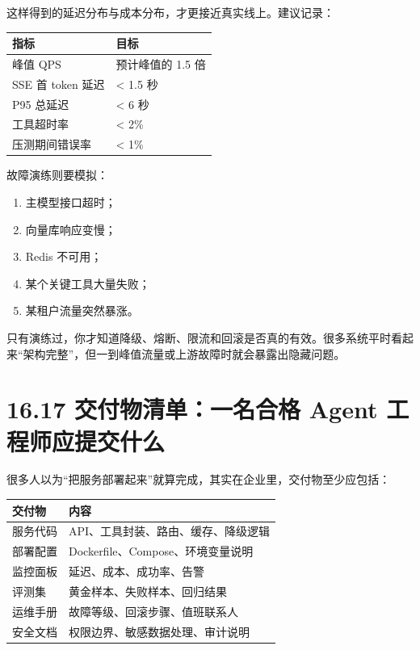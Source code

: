 这样得到的延迟分布与成本分布，才更接近真实线上。建议记录：


\begingroup
\scriptsize
\setlength{\tabcolsep}{3pt}
\begin{longtable}{|p{}|p{}|}
\hline
指标 & 目标 \\ \hline
峰值 QPS & 预计峰值的 1.5 倍 \\ \hline
SSE 首 token 延迟 & < 1.5 秒 \\ \hline
P95 总延迟 & < 6 秒 \\ \hline
工具超时率 & < 2\% \\ \hline
压测期间错误率 & < 1\% \\ \hline
\end{longtable}
\endgroup

故障演练则要模拟：


\begin{enumerate}[leftmargin=2em]
\item 主模型接口超时；
\item 向量库响应变慢；
\item Redis 不可用；
\item 某个关键工具大量失败；
\item 某租户流量突然暴涨。
\end{enumerate}

只有演练过，你才知道降级、熔断、限流和回滚是否真的有效。很多系统平时看起来``架构完整''，但一到峰值流量或上游故障时就会暴露出隐藏问题。


\section{16.17 交付物清单：一名合格 Agent 工程师应提交什么}

很多人以为``把服务部署起来''就算完成，其实在企业里，交付物至少应包括：


\begingroup
\scriptsize
\setlength{\tabcolsep}{3pt}
\begin{longtable}{|p{}|p{}|}
\hline
交付物 & 内容 \\ \hline
服务代码 & API、工具封装、路由、缓存、降级逻辑 \\ \hline
部署配置 & Dockerfile、Compose、环境变量说明 \\ \hline
监控面板 & 延迟、成本、成功率、告警 \\ \hline
评测集 & 黄金样本、失败样本、回归结果 \\ \hline
运维手册 & 故障等级、回滚步骤、值班联系人 \\ \hline
安全文档 & 权限边界、敏感数据处理、审计说明 \\ \hline
\end{longtable}
\endgroup

